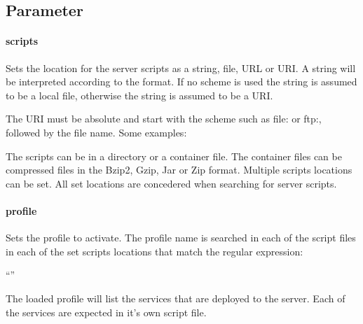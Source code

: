 \subsection{Parameter}

\paragraph{scripts}


Sets the location for the server scripts as a string, file, URL or URI.
A string will be interpreted according to the format. If no scheme is used the string
is assumed to be a local file, otherwise the string is assumed to be a URI.

The URI must be absolute and start with the scheme such as file: or ftp:,
followed by the file name. Some examples:
\begin{compactitem}
\item {}
\item {}
\end{compactitem}

The scripts can be in a directory or a container file. The container files
can be compressed files in the Bzip2, Gzip, Jar or Zip format. Multiple
scripts locations can be set. All set locations are concedered when searching
for server scripts.

\paragraph{profile}


Sets the profile to activate. The profile name is searched in each of the
script files in each of the set scripts locations that match the regular expression:

\begin{compactitem}
\item ``''
\end{compactitem}

The loaded profile will list the services that are deployed to the server.
Each of the services are expected in it's own script file.

